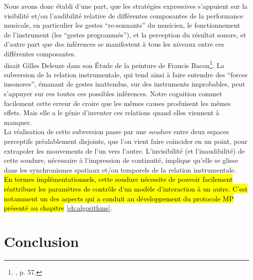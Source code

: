 \noindent Nous avons donc établi d'une part, que les stratégies expressives s'appuient sur la visibilité et/ou l'audibilité relative de différentes composantes de la performance musicale, en particulier les gestes ``re-sonnants'' du musicien, le fonctionnement de l'instrument (les ``gestes programmés''), et la perception du résultat sonore, et d'autre part que des inférences se manifestent à tous les niveaux entre ces différentes composantes.\\
\indent {} disait Gilles Deleuze dans son Étude de la peinture de Francis Bacon\footnote{\cite{deleuze_francis_1981}, p. 57.}. La subversion de la relation instrumentale, qui tend ainsi à faire entendre des ``forces insonores'', émanant de gestes inattendus, sur des instruments improbables, peut s'appuyer sur ces toutes ces possibles inférences. Notre cognition commet facilement cette erreur de croire que les mêmes causes produisent les mêmes effets. Mais elle a le génie d'inventer ces relations quand elles viennent à manquer.\\ 
\indent La réalisation de cette subversion passe par une \textit{soudure} entre deux espaces perceptifs préalablement disjoints, que l'on vient faire coïncider en un point, pour extrapoler les mouvements de l'un vers l'autre. L'invisibilité (et l'inaudibilité) de cette soudure, nécessaire à l'impression de continuité, implique qu'elle se glisse dans les synchronismes spatiaux et/ou temporels de la relation instrumentale.\\ 
\indent \hl{En termes implémentationnels, cette soudure nécessite de pouvoir facilement réattribuer les paramètres de contrôle d'un modèle d'interaction à un autre. C'est notamment un des aspects qui a conduit au développement du protocole MP présenté au chapitre} \ref{ch:algorithms}.

\section{Conclusion}
\label{sec:gesture:conclusion}

